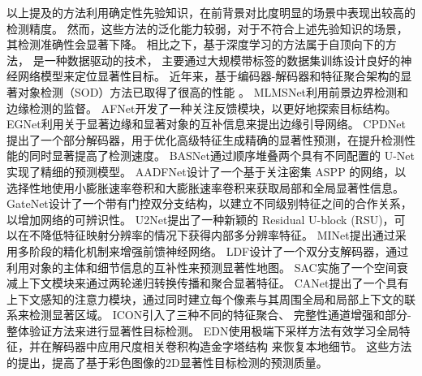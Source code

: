 以上提及的方法利用确定性先验知识，在前背景对比度明显的场景中表现出较高的检测精度。
然而，这些方法的泛化能力较弱，对于不符合上述先验知识的场景，其检测准确性会显著下降。
相比之下，基于深度学习的方法属于自顶向下的方法，
是一种数据驱动的技术，
主要通过大规模带标签的数据集训练设计良好的神经网络模型来定位显著性目标。
近年来，基于编码器-解码器和特征聚合架构的显著对象检测（SOD）方法已取得了很高的性能
。
MLMSNet利用前景边界检测和边缘检测的监督。
AFNet开发了一种关注反馈模块，以更好地探索目标结构。
EGNet利用关于显著边缘和显著对象的互补信息来提出边缘引导网络。
CPDNet提出了一个部分解码器，用于优化高级特征生成精确的显著性预测，在提升检测性能的同时显著提高了检测速度。
BASNet通过顺序堆叠两个具有不同配置的
U-Net实现了精细的预测模型。
AADFNet设计了一个基于关注密集 ASPP 的网络，以选择性地使用小膨胀速率卷积和大膨胀速率卷积来获取局部和全局显著性信息。
GateNet设计了一个带有门控双分支结构，以建立不同级别特征之间的合作关系，以增加网络的可辨识性。
U2Net提出了一种新颖的 Residual U-block (RSU)，可以在不降低特征映射分辨率的情况下获得内部多分辨率特征。
MINet提出通过采用多阶段的精化机制来增强前馈神经网络。
LDF设计了一个双分支解码器，通过利用对象的主体和细节信息的互补性来预测显著性地图。
SAC实施了一个空间衰减上下文模块来通过两轮递归转换传播和聚合显著特征。
CANet提出了一个具有上下文感知的注意力模块，通过同时建立每个像素与其周围全局和局部上下文的联系来检测显著区域。
ICON引入了三种不同的特征聚合、
完整性通道增强和部分-整体验证方法来进行显著性目标检测。
EDN使用极端下采样方法有效学习全局特征，并在解码器中应用尺度相关卷积构造金字塔结构 
来恢复本地细节。
这些方法的提出，提高了基于彩色图像的2D显著性目标检测的预测质量。







\label{chpt1:title:rgbd_methods}

